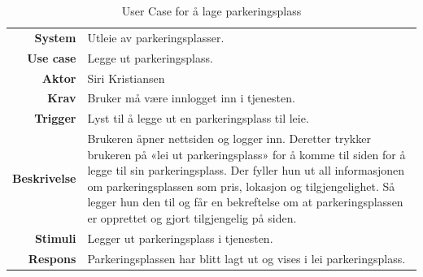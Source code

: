 \begin{table}[H]
\begin{tabularx}{\textwidth}{r|X}
\textbf{System}      & Utleie av parkeringsplasser. \\ [.5em]
\textbf{Use case}    & Legge ut parkeringsplass.  \\ [.5em]
\textbf{Aktor}       & Siri Kristiansen  \\ [.5em]
\textbf{Krav}        & Bruker må være innlogget inn i tjenesten. \\ [.5em]
\textbf{Trigger}     & Lyst til å legge ut en parkeringsplass til leie. \\ [.5em]
\textbf{Beskrivelse} & Brukeren åpner nettsiden og logger inn. Deretter  trykker brukeren på «lei ut parkeringsplass» for å komme til siden for å legge til sin parkeringsplass. Der fyller hun ut all informasjonen om parkeringsplassen som pris, lokasjon og tilgjengelighet. Så legger hun den til og får en bekreftelse om at parkeringsplassen er opprettet og gjort tilgjengelig på siden. \vspace{0.5em} \\ 
\textbf{Stimuli}     & Legger ut parkeringsplass i tjenesten. \\ [.5em]
\textbf{Respons}     & Parkeringsplassen har blitt lagt ut og vises i lei parkeringsplass.         
\end{tabularx}
    \caption{User Case for å lage parkeringsplass}
    \label{tab:Siri_leggeut}
\end{table}



